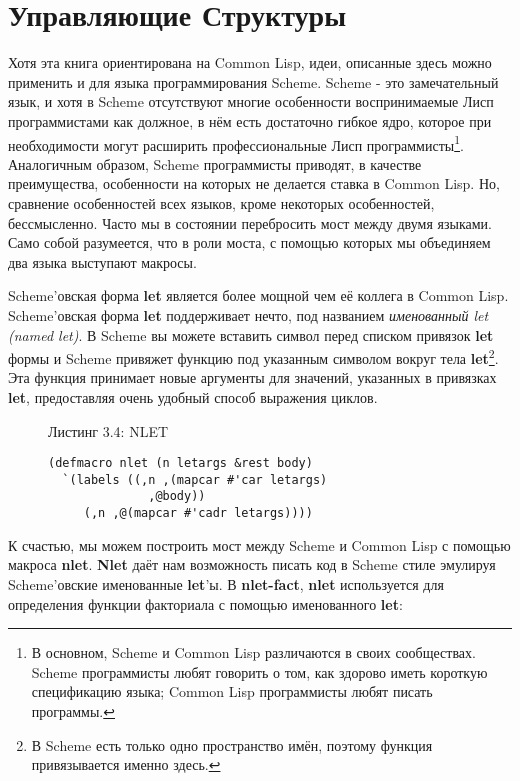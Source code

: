 \section{Управляющие Структуры}\label{section_control_structures}

Хотя эта книга ориентирована на Common Lisp, идеи, описанные здесь можно применить и для языка программирования Scheme. Scheme - это замечательный язык, и хотя в Scheme отсутствуют многие особенности воспринимаемые Лисп программистами как должное, в нём есть достаточно гибкое ядро, которое при необходимости могут расширить профессиональные Лисп программисты\footnote{В основном, Scheme и Common Lisp различаются в своих сообществах. Scheme программисты любят говорить о том, как здорово иметь короткую спецификацию языка; Common Lisp программисты любят писать программы.}. Аналогичным образом, Scheme программисты приводят, в качестве преимущества, особенности на которых не делается ставка в Common Lisp. Но, сравнение особенностей всех языков, кроме некоторых особенностей, бессмысленно. Часто мы в состоянии перебросить мост между двумя языками. Само собой разумеется, что в роли моста, с помощью которых мы объединяем два языка выступают макросы.

Scheme'овская форма \textbf{let} является более мощной чем её коллега в Common Lisp. Scheme'овская форма \textbf{let} поддерживает нечто, под названием \emph{именованный let (named let)}. В Scheme вы можете вставить символ перед списком привязок \textbf{let} формы и Scheme привяжет функцию под указанным символом вокруг тела \textbf{let}\footnote{В Scheme есть только одно пространство имён, поэтому функция привязывается именно здесь.}. Эта функция принимает новые аргументы для значений, указанных в привязках \textbf{let}, предоставляя очень удобный способ выражения циклов.

\begin{figure}Листинг 3.4: NLET\label{listing_3.4}
\listbegin
\begin{verbatim}
(defmacro nlet (n letargs &rest body)
  `(labels ((,n ,(mapcar #'car letargs)
              ,@body))
     (,n ,@(mapcar #'cadr letargs))))
\end{verbatim}
\listend
\end{figure}

К счастью, мы можем построить мост между Scheme и Common Lisp с помощью макроса \textbf{nlet}. \textbf{Nlet} даёт нам возможность писать код в Scheme стиле эмулируя Scheme'овские именованные \textbf{let}'ы. В \textbf{nlet-fact}, \textbf{nlet} используется для определения функции факториала с помощью именованного \textbf{let}:

